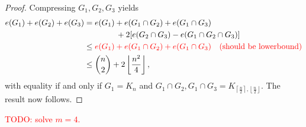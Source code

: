 \documentclass[a4paper]{article}
\newtheorem{theorem}{Theorem}[section]
\begin{document}
  \begin{proof}
    Compressing $G_1, G_2, G_3$ yields
    \begin{align*}
      e(G_1) + e(G_2) + e(G_3) 
      &= e(G_1) + e(G_1 \cap G_2) + e(G_1 \cap G_3) \\
      &\qquad\qquad + 2[e(G_2 \cap G_3) - e(G_1 \cap G_2 \cap G_3)] \\
      &\leq \textcolor{red}{e(G_1) + e(G_1 \cap G_2) + e(G_1 \cap G_3) \quad \text{(should be lowerbound)}} \\
      &\leq \binom{n}{2} + 2\left\lfloor\frac{n^2}{4}\right\rfloor,
    \end{align*}
    with equality if and only if $G_1 = K_n$ and $G_1 \cap G_2, G_1 \cap G_3 =
    K_{\left\lceil\frac{n}{2}\right\rceil, \left\lfloor\frac{n}{2}\right\rfloor}$. The result now
    follows.
  \end{proof}

  \textcolor{red}{TODO: solve $m = 4$.}


\end{document}
